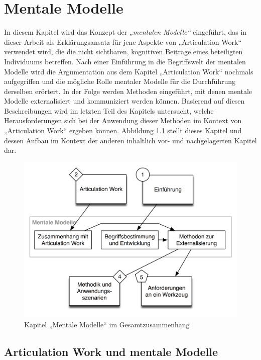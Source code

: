 
\chapter{Mentale Modelle} %
\label{cha:mentale_modelle}

In diesem Kapitel wird das Konzept der \emph{„mentalen Modelle“} eingeführt, das in dieser Arbeit als Erklärungsansatz für jene Aspekte von „Articulation Work“ verwendet wird, die die nicht sichtbaren, kognitiven Beiträge eines beteiligten Individuums betreffen. Nach einer Einführung in die Begriffswelt der mentalen Modelle wird die Argumentation aus dem Kapitel „Articulation Work“ nochmals aufgegriffen und die mögliche Rolle mentaler Modelle für die Durchführung derselben erörtert. In der Folge werden Methoden eingeführt, mit denen mentale Modelle externalisiert und kommuniziert werden können. Basierend auf diesen Beschreibungen wird im letzten Teil des Kapitels untersucht, welche Herausforderungen sich bei der Anwendung dieser Methoden im Kontext von „Articulation Work“ ergeben können. Abbildung \ref{fig:img_Kontextgrafiken_k3} stellt dieses Kapitel und dessen Aufbau im Kontext der anderen inhaltlich vor- und nachgelagerten Kapitel dar.

\begin{figure}[htbp]
	\centering
		\includegraphics[scale=0.6]{img/Kontextgrafiken/k3.png}
	\caption{Kapitel „Mentale Modelle“ im Gesamtzusammenhang}
	\label{fig:img_Kontextgrafiken_k3}
\end{figure}

\section{Articulation Work und mentale Modelle} %
\label{sec:articulation_work_und_mentale_modelle}


